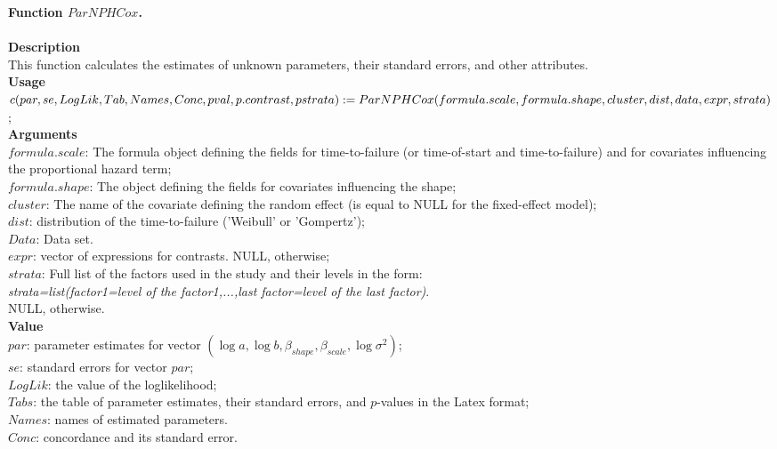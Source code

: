 \documentclass[A4document,12pt]{article}\usepackage[]{graphicx}\usepackage[]{color}
\begin{document}
\noindent
{\textbf{Function $ParNPHCox$.}}
\\\\
\noindent
\textbf{Description}\\
This function calculates the estimates of unknown parameters, their standard errors, and other attributes.\\
\textbf{Usage}\\
$c(par,se,LogLik,Tab,Names,Conc,pval,p.contrast,pstrata):=\\ParNPHCox(formula.scale,formula.shape,cluster,dist,data,expr,strata)$;\\
\textbf{Arguments}
\\
\noindent
$formula.scale$:       The  formula object defining the fields for time-to-failure (or time-of-start and time-to-failure) and for covariates influencing the proportional hazard term;\\
\noindent
$formula.shape$:           The object defining the fields for covariates influencing the shape;\\
\noindent
$cluster$:   The name of the covariate defining the random effect (is equal to NULL for the fixed-effect model);\\
\noindent
$dist$:              distribution of the time-to-failure ('Weibull' or 'Gompertz');\\
\noindent
$Data$:  Data set.\\
\noindent
$expr$:  vector of expressions for contrasts. NULL, otherwise;\\
\noindent
$strata$:  Full list of the factors used in the study and their levels in the form: \\{\it {strata=list(factor1=level of the factor1,...,last factor=level of the last factor)}}.\\ NULL, otherwise.\\
\textbf{Value}\\
\noindent
$par$:        parameter estimates for vector $(\log a,\log b,\beta _{shape},\beta _{scale},\log \sigma ^2)$;\\
\noindent
$se$:        standard errors for vector $par$;\\
\noindent
$LogLik$:        the value of the loglikelihood;\\
\noindent
$Tabs$:        the table of parameter estimates, their standard errors, and $p$-values in the Latex format;\\
\noindent
$Names$:        names of estimated parameters.\\
\noindent
$Conc$:        concordance and its standard error.\\
\end{document}
